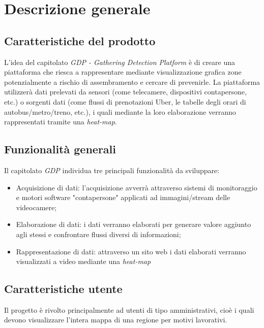 \chapter{Descrizione generale}
\section{Caratteristiche del prodotto}
L'idea del capitolato \textit{GDP - Gathering Detection Platform} è di creare una piattaforma che riesca a rappresentare mediante visualizzazione grafica zone potenzialmente a rischio di assembramento e cercare di prevenirle.
La piattaforma utilizzerà dati prelevati da sensori (come telecamere, dispositivi contapersone, etc.) o sorgenti dati (come flussi di prenotazioni Uber, le tabelle degli orari di autobus/metro/treno, etc.), i quali mediante la loro elaborazione verranno rappresentati tramite una \textit{heat-map}.

\section{Funzionalità generali}
Il capitolato \textit{GDP} individua tre principali funzionalità da sviluppare:
\begin{itemize}
	\item Acquisizione di dati: l'acquisizione avverrà attraverso sistemi di monitoraggio e motori software "contapersone" applicati ad immagini/stream delle videocamere;
	\item Elaborazione di dati: i dati verranno elaborati per generare valore aggiunto agli stessi e confrontare flussi diversi di informazioni;
	\item Rappresentazione di dati: attraverso un sito web i dati elaborati verranno visualizzati a video mediante una \textit{heat-map}
\end{itemize}

\section{Caratteristiche utente}
Il progetto è rivolto principalmente ad utenti di tipo amministrativi, cioè i quali devono visualizzare l'intera mappa di una regione per motivi lavorativi.
